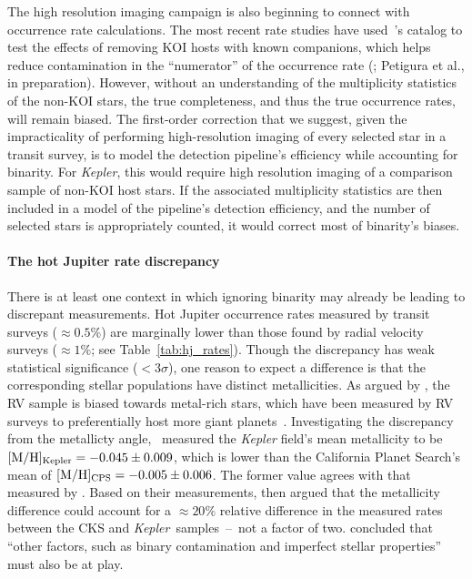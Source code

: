 The high resolution imaging campaign is also beginning to connect with
occurrence rate calculations.
The most recent rate studies have used~\citet{furlan_kepler_2017}'s 
catalog to test the effects of removing KOI hosts with known companions, which 
helps reduce contamination in the ``numerator'' of 
the occurrence rate (\citealt{fulton_california-_2017}; Petigura et al.,
in preparation).
However, without an understanding of the multiplicity statistics of the 
non-KOI stars, the true completeness, and thus the true 
occurrence rates, will remain biased.
The first-order correction that we suggest, given the impracticality of 
performing high-resolution imaging of every selected star in a transit survey,
is to model the detection pipeline's efficiency while accounting for 
binarity.
For {\it Kepler}, this would require high resolution imaging of a
comparison sample of non-KOI host stars. If the associated multiplicity 
statistics are then included in a model of the pipeline's detection 
efficiency, and the number of selected stars is appropriately counted, it 
would correct most of binarity's biases.


\paragraph{The hot Jupiter rate discrepancy}
There is at least one context in which ignoring binarity may already be 
leading to discrepant measurements.
Hot Jupiter occurrence rates measured by transit surveys ($\approx 0.5\%$) are 
marginally lower than those found by radial velocity surveys ($\approx 1\%$; 
see Table~\ref{tab:hj_rates}).
Though the discrepancy has weak statistical significance ($<3\sigma$),
one reason to expect a difference is that the corresponding stellar 
populations have distinct metallicities.
As argued by \citet{gould_frequency_2006}, the RV sample is biased towards 
metal-rich stars, which have been measured by RV surveys to preferentially 
host more giant 
planets~\citep{santos_spectroscopic_2004,fischer_planet-metallicity_2005}.
Investigating the discrepancy from the metallicty 
angle,~\citet{guo_metallicity_2017} measured the
{\it Kepler} field's mean metallicity to be $[{\rm M/H}]_{\rm Kepler}= 
-0.045\pm0.009$, which is lower than the California Planet Search's mean of 
$[{\rm M/H}]_{\rm CPS}= -0.005\pm0.006$.
The former value agrees with that measured by \citet{dong_metallicities_2014}.
Based on their measurements, \citeauthor{guo_metallicity_2017}\! 
then argued that the metallicity difference could account for a $\approx 20\%$ 
relative difference in the measured rates between the CKS and {\it Kepler}\ 
samples~--~not a factor of two.
\citeauthor{guo_metallicity_2017}\! concluded that ``other factors, such as 
binary contamination and imperfect stellar properties'' must also be at play.

